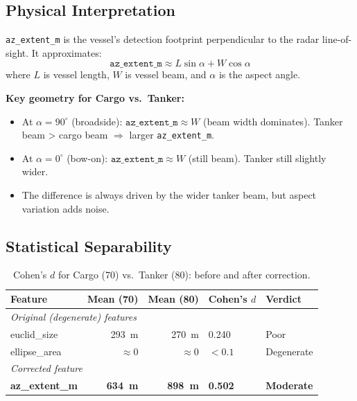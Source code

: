 \documentclass[journal]{IEEEtran}
\begin{document}
\subsection{Physical Interpretation}

\texttt{az\_extent\_m} is the vessel's detection footprint perpendicular to the
radar line-of-sight. It approximates:
\begin{equation}
  \texttt{az\_extent\_m} \approx L\sin\alpha + W\cos\alpha
\end{equation}
where $L$ is vessel length, $W$ is vessel beam, and $\alpha$ is the aspect angle.

\textbf{Key geometry for Cargo vs.\ Tanker:}
\begin{itemize}
  \item At $\alpha = 90^\circ$ (broadside): $\texttt{az\_extent\_m} \approx W$
        (beam width dominates). Tanker beam > cargo beam $\Rightarrow$ larger
        \texttt{az\_extent\_m}.
  \item At $\alpha = 0^\circ$ (bow-on): $\texttt{az\_extent\_m} \approx W$
        (still beam). Tanker still slightly wider.
  \item The difference is always driven by the wider tanker beam, but
        aspect variation adds noise.
\end{itemize}

\subsection{Statistical Separability}

\begin{table}[H]
\centering
\caption{Cohen's $d$ for Cargo (70) vs.\ Tanker (80): before and after correction.}
\begin{tabular}{lrrll}
\toprule
\textbf{Feature} & \textbf{Mean (70)} & \textbf{Mean (80)} & \textbf{Cohen's $d$} & \textbf{Verdict} \\
\midrule
\multicolumn{5}{l}{\textit{Original (degenerate) features}} \\
euclid\_size         & 293~m & 270~m & 0.240 & Poor \\
ellipse\_area        & $\approx0$ & $\approx0$ & $<0.1$ & Degenerate \\
\midrule
\multicolumn{5}{l}{\textit{Corrected feature}} \\
\textbf{az\_extent\_m} & \textbf{634~m} & \textbf{898~m} & \textbf{0.502} & \textbf{Moderate} \\
\bottomrule
\end{tabular}
\end{table}
\end{document}

